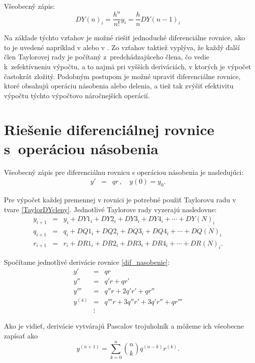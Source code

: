 Všeobecný zápis:
\begin{equation}
DY(n)_{i} =  \dfrac{h^{n}}{n!}y_{i} = \dfrac{h}{n} DY(n-1)_{i} \nonumber
\end{equation}

Na základe týchto vzťahov je možné riešiť jednoduché diferenciálne rovnice, ako to je uvedené napríklad v \cite{OpalkaBP} alebo v \cite{KrausDisP}.
Zo vzťahov taktiež vyplýva, že každý ďalší člen Taylorovej rady je počítaný z~predchádzajúceho člena, čo vedie k~zefektívneniu výpočtu, a to najmä pri vyšších deriváciách, v ktorých je výpočet častokrát zložitý. Podobným postupom je možné upraviť diferenciálne rovnice, ktoré obsahujú operáciu násobenia alebo delenia, a tiež tak zvýšiť efektivitu výpočtu týchto výpočtovo náročnejších operácií. 


\section{Riešenie diferenciálnej rovnice s~operáciou násobenia}
Všeobecný zápis pre diferenciálnu rovnicu s operáciou násobenia je nasledujúci:
\begin{eqnarray}
y' & = & qr \, , \quad y(0) = y_{0} . \label{dif_nasobenie}
\end{eqnarray}

Pre výpočet každej premennej v rovnici je potrebné použiť Taylorovu radu v tvare \eqref{TaylorDYcleny}. Jednotlivé Taylorove rady vyzerajú nasledovne:
\begin{eqnarray}
y_{i + 1} & = & y_{i} + DY1_{i} + DY2_{i} + DY3_{i} + DY4_{i} + \cdots + DY(N)_{i}\\
q_{i+1} & = & q_i + DQ1_i + DQ2_i + DQ3_i + DQ4_i + \cdots + DQ(N)_i\\
r_{i+1} & = & r_i + DR1_i + DR2_i + DR3_i + DR4_i + \cdots + DR(N)_i .
\end{eqnarray}


Spočítame jednotlivé derivácie rovnice \eqref{dif_nasobenie}:
\begin{eqnarray}
y' & = & qr \nonumber \\
y'' & = & q'r + qr' \nonumber \\
y''' & = & q''r + 2q'r' + qr'' \nonumber \\
y^{(4)} & = & q'''r + 3q''r'+ 3q'r'' + qr''' \nonumber \\
 & \vdots \nonumber &
\end{eqnarray}


Ako je vidieť, derivácie vytvárajú Pascalov trojuholník a môžeme ich všeobecne zapísať ako
\begin{equation}
y^{(n+1)} = \sum_{k=0}^n \binom{n}{k} q^{(n-k)} r^{(k)} . \nonumber
\end{equation}
\bigskip

